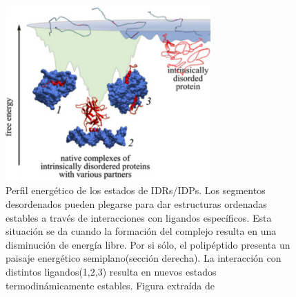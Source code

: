 \begin{figure}[h]
\centering
\includegraphics[width=0.7\textwidth]{img/idp-binding-EnLandscape2.png} 
\caption{Perfil energético de los estados de IDRs/IDPs. Los segmentos desordenados pueden plegarse para dar estructuras ordenadas estables a través de interacciones con ligandos específicos.
Esta situación se da cuando la formación del complejo resulta en una disminución de energía libre. 
Por si sólo, el polipéptido presenta un paisaje energético semiplano(sección derecha). La interacción con distintos ligandos(1,2,3) resulta en nuevos estados termodinámicamente estables.
Figura extraída de \cite{turoverov2010protein}}
\label{idpBindingEnLandscape}
\end{figure}


